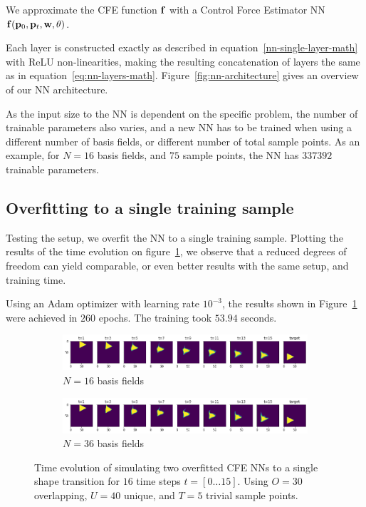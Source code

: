 We approximate the \ac{CFE} function $\vb{f}$ with a Control Force Estimator
\acf{NN} $\vb{f}(\vb{p}_0, \vb{p}_t, \vb{w}, \vb{\theta})$. 

Each layer is constructed exactly as described in
equation~\eqref{nn-single-layer-math} with ReLU non-linearities, making the
resulting concatenation of layers the same as in
equation~\eqref{eq:nn-layers-math}. Figure~\ref{fig:nn-architecture} gives an
overview of our \ac{NN} architecture. 



As the input size to the \ac{NN} is dependent on the specific problem, the
number of trainable parameters also varies, and a new \ac{NN} has to be trained
when using a different number of basis fields, or different number of total
sample points. As an example, for $N=16$ basis fields, and $75$ sample points,
the \ac{NN} has $337 392$ trainable parameters.

\subsection*{Overfitting to a single training sample}
Testing the setup, we overfit the \ac{NN} to a single training sample. Plotting
the results of the time evolution on figure~\ref{fig:NN-overfit}, we observe
that a reduced degrees of freedom can yield comparable, or even better results
with the same setup, and training time. 

Using an Adam optimizer \cite{adam} with learning rate $10^{-3}$, the results
shown in Figure~\ref{fig:NN-overfit} were achieved in $260$ epochs. The
training took $53.94$ seconds.

\begin{figure}
  \centering
  \begin{subfigure}{\textwidth}
    \centering
    \includegraphics[width=\textwidth]{figures/nn-training/NN_N16_triangle_overfit_horizontal.png}
    \caption{$N=16$ basis fields}
  \end{subfigure}
  \begin{subfigure}{\textwidth}
    \centering
    \includegraphics[width=\textwidth]{figures/nn-training/NN_N36_triangle_overfit_horizontal.png}
    \caption{$N=36$ basis fields}
  \end{subfigure}
  \caption{Time evolution of simulating two overfitted \ac{CFE} \acp{NN} to
  a single shape transition for $16$ time steps $t=[0\dots15]$. Using $O=30$
overlapping, $U=40$ unique, and $T=5$  trivial sample points.}
  \label{fig:NN-overfit}
\end{figure}

